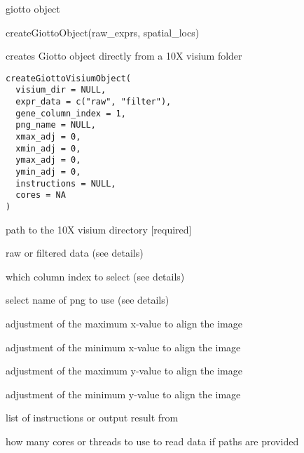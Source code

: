 \documentclass[a4paper]{book}
\begin{document}
%
\begin{Value}
giotto object
\end{Value}
%
\begin{Examples}
\begin{ExampleCode}
    createGiottoObject(raw_exprs, spatial_locs)
\end{ExampleCode}
\end{Examples}
%
\begin{Description}\relax
creates Giotto object directly from a 10X visium folder
\end{Description}
%
\begin{Usage}
\begin{verbatim}
createGiottoVisiumObject(
  visium_dir = NULL,
  expr_data = c("raw", "filter"),
  gene_column_index = 1,
  png_name = NULL,
  xmax_adj = 0,
  xmin_adj = 0,
  ymax_adj = 0,
  ymin_adj = 0,
  instructions = NULL,
  cores = NA
)
\end{verbatim}
\end{Usage}
%
\begin{Arguments}
\begin{ldescription}
\item[\code{visium\_dir}] path to the 10X visium directory [required]

\item[\code{expr\_data}] raw or filtered data (see details)

\item[\code{gene\_column\_index}] which column index to select (see details)

\item[\code{png\_name}] select name of png to use (see details)

\item[\code{xmax\_adj}] adjustment of the maximum x-value to align the image

\item[\code{xmin\_adj}] adjustment of the minimum x-value to align the image

\item[\code{ymax\_adj}] adjustment of the maximum y-value to align the image

\item[\code{ymin\_adj}] adjustment of the minimum y-value to align the image

\item[\code{instructions}] list of instructions or output result from 

\item[\code{cores}] how many cores or threads to use to read data if paths are provided
\end{ldescription}
\end{Arguments}
\end{document}
